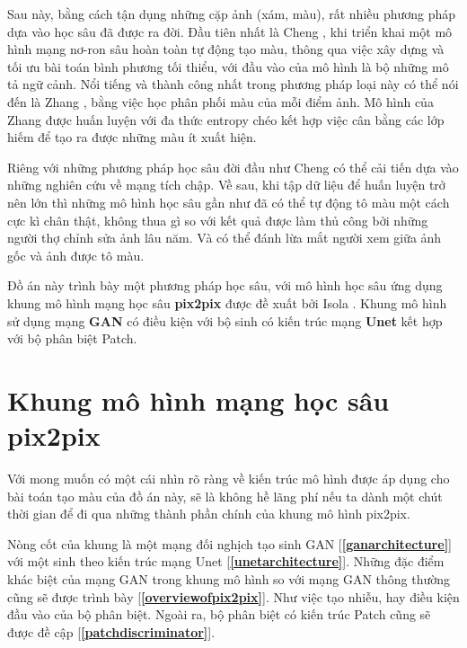 \documentclass[a4paper, 12pt]{report}
\begin{document}
Sau này, bằng cách tận dụng những cặp ảnh (xám, màu), rất nhiều phương pháp dựa vào học sâu đã được ra đời.
Đầu tiên nhất là Cheng \cite{chengcolorization}, khi triển khai một mô hình mạng nơ-ron sâu hoàn toàn tự động tạo màu, thông qua việc xây dựng và tối ưu bài toán bình phương tối thiểu, với đầu vào của mô hình là bộ những mô tả ngữ cảnh.
Nổi tiếng và thành công nhất trong phương pháp loại này có thể nói đến là Zhang \cite{zhangcolorization}, bằng việc học phân phối màu của mỗi điểm ảnh.
Mô hình của Zhang được huấn luyện với đa thức entropy chéo kết hợp việc cân bằng các lớp hiếm để tạo ra được những màu ít xuất hiện.\vspace{5pt}

Riêng với những phương pháp học sâu đời đầu như Cheng có thể cải tiến dựa vào những nghiên cứu về mạng tích chập.
Về sau, khi tập dữ liệu để huấn luyện trở nên lớn thì những mô hình học sâu gần như đã có thể tự động tô màu một cách cực kì chân thật, không thua gì so với kết quả được làm thủ công bởi những người thợ chỉnh sửa ảnh lâu năm.
Và có thể đánh lừa mắt người xem giữa ảnh gốc và ảnh được tô màu.\vspace{5pt}

Đồ án này trình bày một phương pháp học sâu, với mô hình học sâu ứng dụng khung mô hình mạng học sâu \textbf{pix2pix} được đề xuất bởi Isola \cite{isola2018imagetoimage}.
Khung mô hình sử dụng mạng \textbf{GAN} \cite{goodfellow2014generative} có điều kiện với bộ sinh có kiến trúc mạng \textbf{Unet} \cite{ronneberger2015unet} kết hợp với bộ phân biệt Patch.

\chapter{Khung mô hình mạng học sâu pix2pix}\label{pix2pixframework}

Với mong muốn có một cái nhìn rõ ràng về kiến trúc mô hình được áp dụng cho bài toán tạo màu của đồ án này, sẽ là không hề lãng phí nếu ta dành một chút thời gian để đi qua những thành phần chính của khung mô hình pix2pix.\vspace{5pt}

Nòng cốt của khung là một mạng đối nghịch tạo sinh GAN [\textbf{\ref{ganarchitecture}}] với một sinh theo kiến trúc mạng Unet [\textbf{\ref{unetarchitecture}}].
Những đặc điểm khác biệt của mạng GAN trong khung mô hình so với mạng GAN thông thường cũng sẽ được trình bày [\textbf{\ref{overviewofpix2pix}}].
Như việc tạo nhiễu, hay điều kiện đầu vào của bộ phân biệt.
Ngoài ra, bộ phân biệt có kiến trúc Patch cũng sẽ được đề cập [\textbf{\ref{patchdiscriminator}}].
\end{document}
